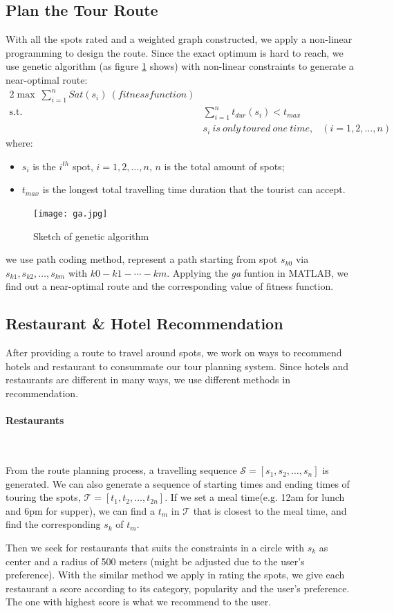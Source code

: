 \documentclass{mcmthesis}
\begin{document}
\subsection{Plan the Tour Route}
  With all the spots rated and a weighted graph constructed, we apply a non-linear programming to design the route. Since the exact optimum is hard to reach, we use genetic algorithm (as figure \ref{fig:ga} shows) with non-linear constraints to generate a near-optimal route:
  \begin{alignat}{2}   %
    \max~\sum_{i=1}^{n}Sat(s_{i})~(fitness function)\\
    \mbox{s.t.}\quad
    &\sum_{i=1}^{n}t_{dur}(s_{i}) < t_{max}\\
    &s_{i}~is~only~toured~one~time, & (i=1,2,\ldots,n)
  \end{alignat}
  where:
  \begin{itemize}
    \item $s_{i}$ is the $i^{th}$ spot, $i=1,2,\ldots,n$, $n$ is the total amount of spots;
    \item $t_{max}$ is the longest total travelling time duration that the tourist can accept.
  \end{itemize}
  \begin{figure}[h]
    \centering
    \texttt{[image: ga.jpg]}
    \caption{Sketch of genetic algorithm}
    \label{fig:ga}
  \end{figure}
  we use path coding method, represent a path starting from spot $s_{k0}$ via $s_{k1}, s_{k2},\ldots,s_{km}$ with $k0-k1-\cdots-km$. Applying the \emph{ga} funtion in MATLAB, we find out a near-optimal route and the corresponding value of fitness function.
 

\subsection{Restaurant \& Hotel Recommendation}
  After providing a route to travel around spots, we work on ways to recommend hotels and restaurant to consummate our tour planning system. Since hotels and restaurants are different in many ways, we use different methods in recommendation.
  \paragraph{Restaurants}\
  
  From the route planning process, a travelling sequence $\mathscr{S} = [s_{1}, s_{2}, \ldots, s_{n}]$ is generated. We can also generate a sequence of starting times and ending times of touring the spots, $\mathscr{T} = [t_{1}, t_{2}, \ldots, t_{2n}]$. If we set a meal time(e.g. 12am for lunch and 6pm for supper), we can find a $t_{m}$ in $\mathscr{T}$ that is closest to the meal time, and find the corresponding $s_{k}$ of $t_{m}$. \par
  Then we seek for restaurants that suits the constraints in a circle with $s_{k}$ as center and a radius of 500 meters (might be adjusted due to the user's preference). With the similar method we apply in rating the spots, we give each restaurant a score according to its category, popularity and the user's preference. The one with highest score is what we recommend to the user.
\end{document}
